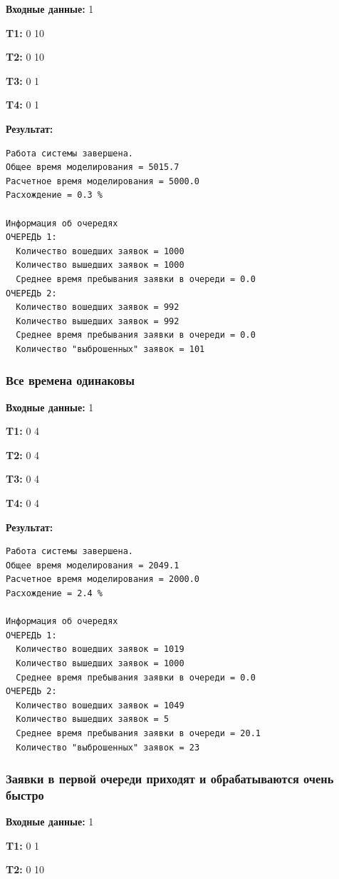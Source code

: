 \documentclass[a4paper,12pt]{extarticle}
\begin{document}
\textbf{Входные данные: }
1

\textbf{T1: }
0 10

\textbf{T2: }
0 10

\textbf{T3: }
0 1

\textbf{T4: }
0 1


\textbf{Результат: }
\begin{verbatim}
Работа системы завершена.
Общее время моделирования = 5015.7
Расчетное время моделирования = 5000.0
Расхождение = 0.3 %

Информация об очередях
ОЧЕРЕДЬ 1:
  Количество вошедших заявок = 1000
  Количество вышедших заявок = 1000
  Среднее время пребывания заявки в очереди = 0.0
ОЧЕРЕДЬ 2:
  Количество вошедших заявок = 992
  Количество вышедших заявок = 992
  Среднее время пребывания заявки в очереди = 0.0
  Количество "выброшенных" заявок = 101
\end{verbatim}


\subsubsection{Все времена одинаковы}

\textbf{Входные данные: }
1

\textbf{T1: }
0 4

\textbf{T2: }
0 4

\textbf{T3: }
0 4

\textbf{T4: }
0 4


\textbf{Результат: }
\begin{verbatim}
Работа системы завершена.
Общее время моделирования = 2049.1
Расчетное время моделирования = 2000.0
Расхождение = 2.4 %

Информация об очередях
ОЧЕРЕДЬ 1:
  Количество вошедших заявок = 1019
  Количество вышедших заявок = 1000
  Среднее время пребывания заявки в очереди = 0.0
ОЧЕРЕДЬ 2:
  Количество вошедших заявок = 1049
  Количество вышедших заявок = 5
  Среднее время пребывания заявки в очереди = 20.1
  Количество "выброшенных" заявок = 23
\end{verbatim}

\subsubsection{Заявки в первой очереди приходят и обрабатываются очень быстро}

\textbf{Входные данные: }
1

\textbf{T1: }
0 1

\textbf{T2: }
0 10
\end{document}

